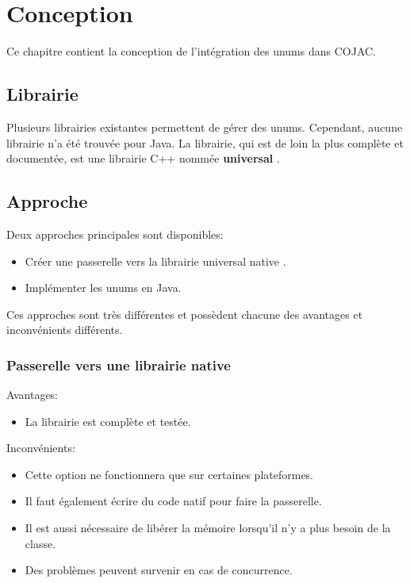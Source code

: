 \section{Conception}

Ce chapitre contient la conception de l'intégration des unums dans COJAC.

\subsection{Librairie}

Plusieurs librairies existantes permettent de gérer des unums. Cependant, aucune librairie n'a été trouvée pour Java. La librairie, qui est de loin la plus complète et documentée, est une librairie C++ nommée \textbf{universal} \cite{universal-github}.

\subsection{Approche}

Deux approches principales sont disponibles:
\begin{itemize}
    \item Créer une passerelle vers la librairie universal native \cite{universal-github}.
    \item Implémenter les unums en Java.
\end{itemize}

Ces approches sont très différentes et possèdent chacune des avantages et inconvénients différents.

\subsubsection{Passerelle vers une librairie native}

Avantages:
\begin{itemize}
    \item La librairie est complète et testée.
\end{itemize}

Inconvénients:
\begin{itemize}
    \item Cette option ne fonctionnera que sur certaines plateformes.
    \item Il faut également écrire du code natif pour faire la passerelle.
    \item Il est aussi nécessaire de libérer la mémoire lorsqu'il n'y a plus besoin de la classe.
    \item Des problèmes peuvent survenir en cas de concurrence.
\end{itemize}

